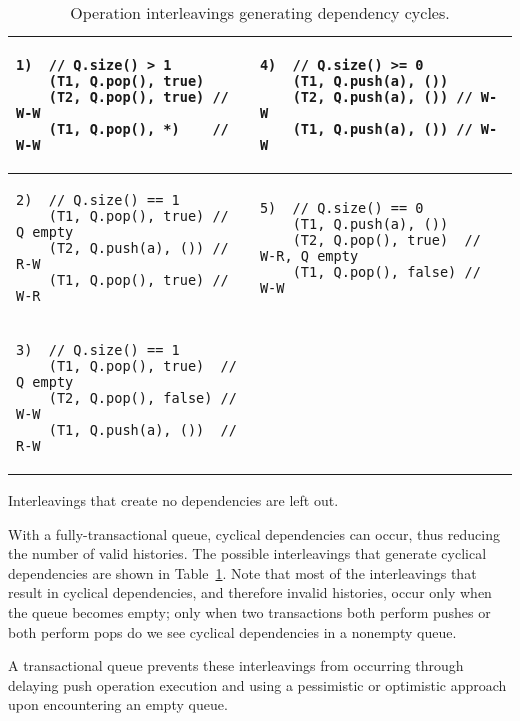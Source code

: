 \begin{table}
    \centering
    \begin{tabular}{|l|l|}
        \hline
\begin{lstlisting}
1)  // Q.size() > 1 
    (T1, Q.pop(), true)  
    (T2, Q.pop(), true) // W-W
    (T1, Q.pop(), *)    // W-W
\end{lstlisting}
        &
\begin{lstlisting}
4)  // Q.size() >= 0 
    (T1, Q.push(a), ()) 
    (T2, Q.push(a), ()) // W-W
    (T1, Q.push(a), ()) // W-W
\end{lstlisting}
\\
\hline
\begin{lstlisting}
2)  // Q.size() == 1  
    (T1, Q.pop(), true) // Q empty  
    (T2, Q.push(a), ()) // R-W
    (T1, Q.pop(), true) // W-R
    \end{lstlisting}
        &
\begin{lstlisting}
5)  // Q.size() == 0 
    (T1, Q.push(a), ())       
    (T2, Q.pop(), true)  // W-R, Q empty
    (T1, Q.pop(), false) // W-W
\end{lstlisting}
\\
    \hline
    \begin{lstlisting}
3)  // Q.size() == 1  
    (T1, Q.pop(), true)  // Q empty  
    (T2, Q.pop(), false) // W-W     
    (T1, Q.push(a), ())  // R-W     
    \end{lstlisting} &\\
        \hline
\end{tabular}
    \caption*{Interleavings that create no dependencies are left out.}
    \caption{Operation interleavings generating dependency cycles.}
    \label{tab:interleavings}
\end{table}

With a fully-transactional queue, cyclical dependencies can occur, thus reducing the number of valid histories. The possible interleavings that generate cyclical dependencies are shown in Table~\ref{tab:interleavings}. Note that most of the interleavings that result in cyclical dependencies, and therefore invalid histories, occur only when the queue becomes empty; only when two transactions both perform pushes or both perform pops do we see cyclical dependencies in a nonempty queue. 

A transactional queue prevents these interleavings from occurring through delaying push operation execution and using a pessimistic or optimistic approach upon encountering an empty queue.

